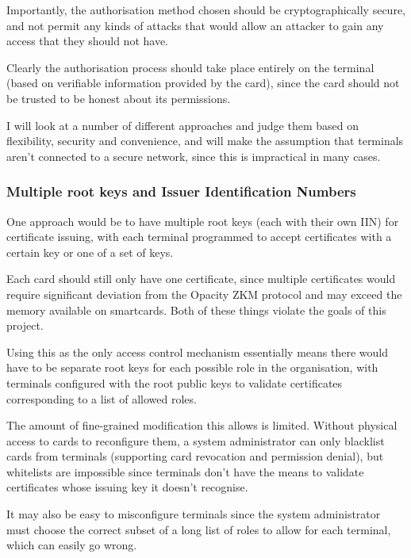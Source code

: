 \documentclass[12pt,a4paper]{article}
\begin{document}
Importantly, the authorisation method chosen should be cryptographically secure, and not permit any kinds of attacks that would allow an attacker to gain any access that they should not have.

Clearly the authorisation process should take place entirely on the terminal (based on verifiable information provided by the card), since the card should not be trusted to be honest about its permissions.

I will look at a number of different approaches and judge them based on flexibility, security and convenience, and will make the assumption that terminals aren't connected to a secure network, since this is impractical in many cases.

\subsubsection{Multiple root keys and Issuer Identification Numbers}

One approach would be to have multiple root keys (each with their own IIN) for certificate issuing, with each terminal programmed to accept certificates with a certain key or one of a set of keys.

Each card should still only have one certificate, since multiple certificates would require significant deviation from the Opacity ZKM protocol and may exceed the memory available on smartcards. Both of these things violate the goals of this project.

Using this as the only access control mechanism essentially means there would have to be separate root keys for each possible role in the organisation, with terminals configured with the root public keys to validate certificates corresponding to a list of allowed roles.

The amount of fine-grained modification this allows is limited. Without physical access to cards to reconfigure them, a system administrator can only blacklist cards from terminals (supporting card revocation and permission denial), but whitelists are impossible since terminals don't have the means to validate certificates whose issuing key it doesn't recognise.

It may also be easy to misconfigure terminals since the system administrator must choose the correct subset of a long list of roles to allow for each terminal, which can easily go wrong.
\end{document}
